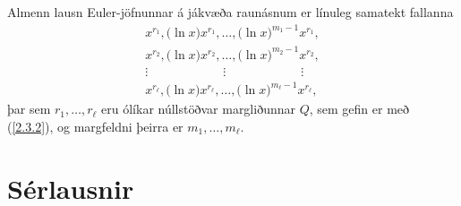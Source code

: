\begin{se}  Almenn lausn Euler-jöfnunnar á jákvæða raunásnum
er línuleg samatekt fallanna
\begin{gather*}
x^{r_1}, \big(\ln x \big) x^{r_1}, \dots,
\big(\ln x\big)^{m_1-1}x^{r_1},\\
x^{r_2}, \big(\ln x\big)x^{r_2}, \dots,
\big(\ln x \big)^{m_2-1} x^{r_2},\\
\vdots \qquad \qquad \qquad \vdots \qquad \qquad \qquad \vdots\\ 
x^{r_\ell}, \big(\ln x \big)x^{r_\ell}, \dots,
\big(\ln x\big)^{m_\ell-1} x^{r_\ell},
\end{gather*}
þar sem $r_1,\dots,r_\ell$ eru ólíkar núllstöðvar  margliðunnar
$Q$, sem gefin er með (\ref{2.3.2}), og margfeldni þeirra er 
$m_1,\dots,m_\ell$.
\end{se}



\section{Sérlausnir}

